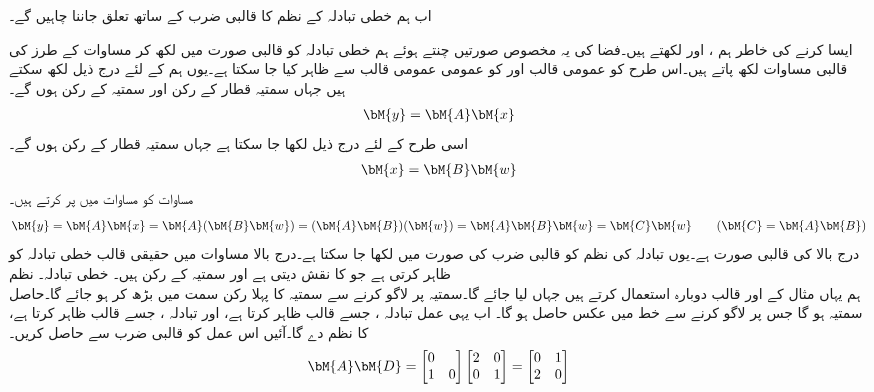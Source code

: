 اب ہم خطی تبادلہ کے نظم کا قالبی ضرب کے ساتھ تعلق جاننا چاہیں گے۔

ایسا کرنے کی خاطر ہم ،  اور  لکھتے ہیں۔فضا کی یہ مخصوص صورتیں چنتے ہوئے ہم خطی تبادلہ کو قالبی صورت میں لکھ  کر مساوات  کے طرز کی  قالبی مساوات لکھ پاتے ہیں۔اس طرح  کو  عمومی قالب 
 اور  کو عمومی  عمومی قالب  سے ظاہر کیا جا سکتا ہے۔یوں ہم  کے لئے درج ذیل لکھ سکتے ہیں جہاں سمتیہ قطار  کے  رکن اور سمتیہ  کے  رکن ہوں گے۔
\begin{align}\label{مساوات_الجبرا_نظم_استعمال_الف}
\bM{y}=\bM{A}\bM{x}
\end{align}
اسی طرح  کے لئے درج ذیل لکھا جا سکتا ہے جہاں سمتیہ قطار  کے  رکن ہوں گے۔
\begin{align}\label{مساوات_الجبرا_نظم_استعمال_ب}
\bM{x}=\bM{B}\bM{w}
\end{align}
مساوات  کو مساوات  میں پر کرتے ہیں۔
\begin{align}\label{مساوات_الجبرا_نظم_کی_تعریف}
\bM{y}=\bM{A}\bM{x}=\bM{A}(\bM{B}\bM{w})=(\bM{A}\bM{B})(\bM{w})=\bM{A}\bM{B}\bM{w}=\bM{C}\bM{w}\quad\quad  (\bM{C}=\bM{A}\bM{B})
\end{align}
درج بالا   کی قالبی صورت ہے۔یوں تبادلہ کی نظم کو قالبی ضرب کی صورت میں لکھا جا سکتا ہے۔درج بالا مساوات میں حقیقی  قالب  خطی تبادلہ  کو ظاہر کرتی ہے جو  کا نقش  دیتی ہے اور سمتیہ  کے  رکن ہیں۔
\quad خطی تبادلہ۔ نظم\\
ہم یہاں مثال  کے  اور  قالب دوبارہ استعمال کرتے ہیں جہاں  لیا جائے گا۔سمتیہ  پر  لاگو کرنے سے  سمتیہ کا پہلا رکن  سمت میں بڑھ کر   ہو جائے گا۔حاصل سمتیہ  ہو گا جس پر  لاگو کرنے سے خط  میں عکس  حاصل ہو گا۔ اب یہی عمل تبادلہ ، جسے قالب  ظاہر کرتا ہے،  اور تبادلہ ، جسے  قالب  ظاہر کرتا ہے، کا نظم  دے گا۔آئیں اس عمل کو قالبی ضرب سے حاصل کریں۔
\begin{align*}
\bM{A}\bM{D}=\begin{bmatrix*}[r]0&\\1&0  \end{bmatrix*} \begin{bmatrix*}[r] 2&0\\0&1 \end{bmatrix*}=\begin{bmatrix*}[r] 0&1\\2&0 \end{bmatrix*}
\end{align*}
